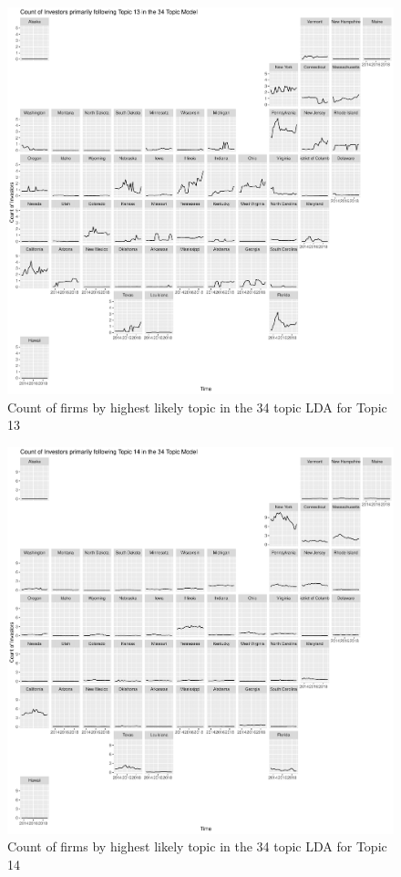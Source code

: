 		\begin{figure}
		\centering
		\includegraphics[width=1\linewidth]{Figures/ChapterV/USA_34_Topic13.pdf}
		\caption[Count of firm for Topic 13 by quarter]{Count of firms by highest likely topic in the 34 topic LDA for Topic 13}
		\label{fig:StateLDA13}
	\end{figure}
	
		\begin{figure}
		\centering
		\includegraphics[width=1\linewidth]{Figures/ChapterV/USA_34_Topic14.pdf}
		\caption[Count of firm for Topic 14 by quarter]{Count of firms by highest likely topic in the 34 topic LDA for Topic 14}
		\label{fig:StateLDA14}
	\end{figure}
	
